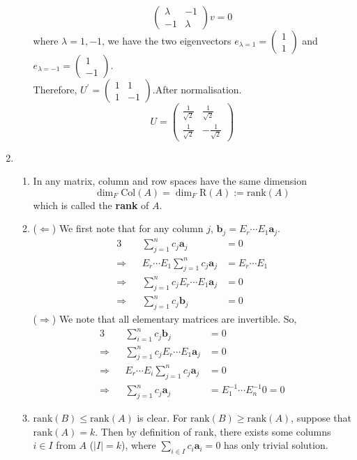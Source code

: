 \documentclass[12pt]{article}
\newcommand{\col}{\mathrm{Col}}
\newcommand{\row}{\mathrm{R}}
\newcommand{\rank}{\mathrm{rank}}
\newcommand{\inv}{^{-1}}
\theoremstyle{definition}
\begin{document}
\begin{enumerate}
\begin{enumerate}
\[
\begin{pmatrix}\lambda&-1\\-1&\lambda\end{pmatrix}v=0
\]
where $\lambda = 1,-1$, we have the two eigenvectors $e_{\lambda = 1}=\begin{pmatrix}1\\1\end{pmatrix}$ and $e_{\lambda=-1}=\begin{pmatrix}1\\-1\end{pmatrix}$.\\Therefore, $U^\prime=\begin{pmatrix}1&1\\1&-1\end{pmatrix}$.After normalisation.
\[
U=\begin{pmatrix}\frac{1}{\sqrt{2}}&\frac{1}{\sqrt{2}}\\\frac{1}{\sqrt{2}}&-\frac{1}{\sqrt{2}}\end{pmatrix}
\]
\end{enumerate}
\item 
\begin{enumerate}
\item In any matrix, column and row spaces have the same dimension
\[
\dim_ F\col(A)=\dim_ F\row(A):=\rank(A)
\]
which is called the \textbf{rank} of $A$.
\item ($\Leftarrow$) We first note that for any column $j$, $\mathbf{b}_j = E_r\cdots E_1 \mathbf{a}_j$.
\begin{alignat*}{3}
&&\sum_{j=1}^n c_j\mathbf{a}_j &= 0\\
\Rightarrow&& E_r\cdots E_1\sum_{j=1}^n c_j\mathbf{a}_j&=E_r\cdots E_1 \\
\Rightarrow&& \sum_{j=1}^n c_j E_r\cdots E_1 \mathbf{a}_j &= 0\\
\Rightarrow&& \sum_{j=1}^n c_j\mathbf{b}_j &= 0
\end{alignat*}
($\Rightarrow$) We note that all elementary matrices are invertible. So,
\begin{alignat*}{3}
&&\sum_{i=1}^n c_j \mathbf{b}_j&=0\\
\Rightarrow&&\sum_{j=1}^n c_j E_r\cdots E_1 \mathbf{a}_j &= 0\\
\Rightarrow&&E_r\cdots E_i\sum_{j=1}^n c_j\mathbf{a}_j&=0\\
\Rightarrow&&\sum_{j=1}^n c_j\mathbf{a}_j&=E_1\inv\cdots E_n\inv 0=0
\end{alignat*}
\item $\rank(B)\leq \rank(A)$ is clear. For $\rank(B)\geq \rank(A)$, suppose that $\rank(A)=k$. Then by definition of rank, there exists some columns $i\in I$ from $A$ ($|I|=k$), where $\sum_{i\in I}c_i\mathbf{a}_i=0$ has only trivial solution.\\

\end{enumerate}
\end{enumerate}
\end{document}

